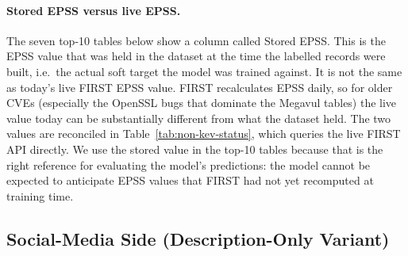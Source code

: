 \documentclass[11pt]{article}
\begin{document}
\paragraph{Stored EPSS versus live EPSS.}
The seven top-10 tables below show a column called Stored EPSS. This
is the EPSS value that was held in the dataset at the time the
labelled records were built, i.e.\ the actual soft target the model
was trained against. It is not the same as today's live FIRST EPSS
value. FIRST recalculates EPSS daily, so for older CVEs (especially
the OpenSSL bugs that dominate the Megavul tables) the live value
today can be substantially different from what the dataset held. The
two values are reconciled in Table~\ref{tab:non-kev-status}, which
queries the live FIRST API directly. We use the stored value in the
top-10 tables because that is the right reference for evaluating the
model's predictions: the model cannot be expected to anticipate EPSS
values that FIRST had not yet recomputed at training time.

\subsection{Social-Media Side (Description-Only Variant)}
\end{document}
